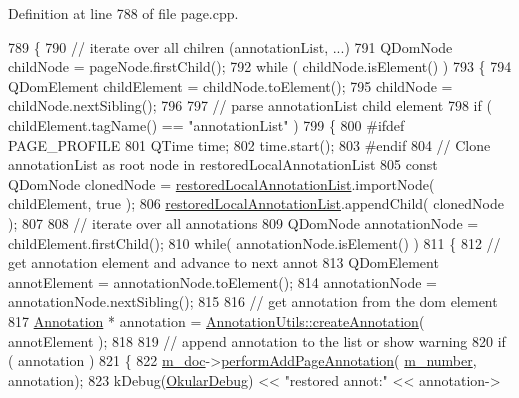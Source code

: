 Definition at line 788 of file page.\+cpp.


\begin{DoxyCode}
789 \{
790     \textcolor{comment}{// iterate over all chilren (annotationList, ...)}
791     QDomNode childNode = pageNode.firstChild();
792     \textcolor{keywordflow}{while} ( childNode.isElement() )
793     \{
794         QDomElement childElement = childNode.toElement();
795         childNode = childNode.nextSibling();
796 
797         \textcolor{comment}{// parse annotationList child element}
798         \textcolor{keywordflow}{if} ( childElement.tagName() == \textcolor{stringliteral}{"annotationList"} )
799         \{
800 \textcolor{preprocessor}{#ifdef PAGE\_PROFILE}
801             QTime time;
802             time.start();
803 \textcolor{preprocessor}{#endif}
804             \textcolor{comment}{// Clone annotationList as root node in restoredLocalAnnotationList}
805             \textcolor{keyword}{const} QDomNode clonedNode = \hyperlink{classOkular_1_1PagePrivate_ac81ba5bf127f946b7b810821081c9f42}{restoredLocalAnnotationList}.importNode( 
      childElement, \textcolor{keyword}{true} );
806             \hyperlink{classOkular_1_1PagePrivate_ac81ba5bf127f946b7b810821081c9f42}{restoredLocalAnnotationList}.appendChild( clonedNode );
807 
808             \textcolor{comment}{// iterate over all annotations}
809             QDomNode annotationNode = childElement.firstChild();
810             \textcolor{keywordflow}{while}( annotationNode.isElement() )
811             \{
812                 \textcolor{comment}{// get annotation element and advance to next annot}
813                 QDomElement annotElement = annotationNode.toElement();
814                 annotationNode = annotationNode.nextSibling();
815 
816                 \textcolor{comment}{// get annotation from the dom element}
817                 \hyperlink{classOkular_1_1Annotation}{Annotation} * annotation = 
      \hyperlink{classOkular_1_1AnnotationUtils_a790854adbb753b2a448640021442bf73}{AnnotationUtils::createAnnotation}( annotElement );
818 
819                 \textcolor{comment}{// append annotation to the list or show warning}
820                 \textcolor{keywordflow}{if} ( annotation )
821                 \{
822                     \hyperlink{classOkular_1_1PagePrivate_ab08c9b47d5e631b19dd2d5c85360d351}{m\_doc}->\hyperlink{classOkular_1_1DocumentPrivate_a374e55b575f2386536cd438bd2338b33}{performAddPageAnnotation}(
      \hyperlink{classOkular_1_1PagePrivate_a449baffebfd4db332b181cb2e644ab5e}{m\_number}, annotation);
823                     kDebug(\hyperlink{debug__p_8h_af16c6e32a95969dd0605d792ec9807c7}{OkularDebug}) << \textcolor{stringliteral}{"restored annot:"} << annotation->

\end{DoxyCode}
